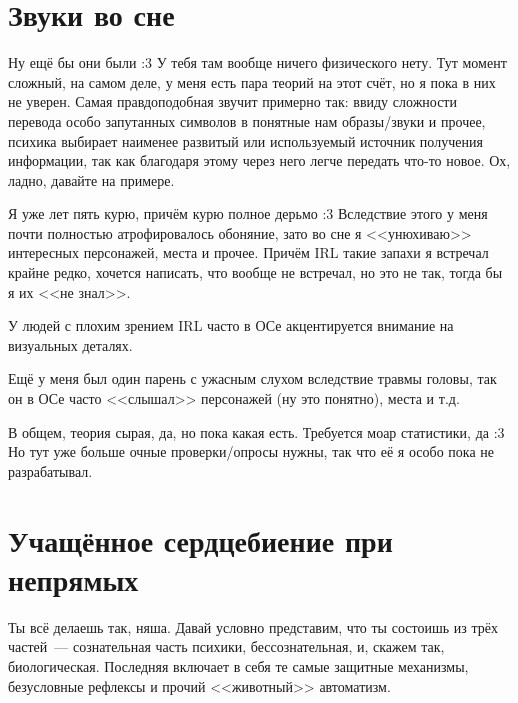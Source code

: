 \documentclass[a5paper,12pt,twoside]{memoir}
\begin{document}
\section{Звуки во сне}

Ну ещё бы они были :3 У тебя там вообще ничего физического нету. Тут момент сложный, на самом деле, у меня есть пара теорий на этот счёт, но я пока в них не уверен. 
Самая правдоподобная звучит примерно так: ввиду сложности перевода особо запутанных символов в понятные нам образы/звуки и прочее, психика выбирает наименее развитый или используемый источник получения информации, так как благодаря этому через него легче передать что-то новое. Ох, ладно, давайте на примере.

Я уже лет пять курю, причём курю полное дерьмо :3 Вследствие этого у меня почти полностью атрофировалось обоняние, зато во сне я <<унюхиваю>> интересных персонажей, места и прочее. Причём IRL такие запахи я встречал крайне редко, хочется написать, что вообще не встречал, но это не так, тогда бы я их <<не знал>>.

У людей с плохим зрением IRL часто в ОСе акцентируется внимание на визуальных деталях. 

Ещё у меня был один парень с ужасным слухом вследствие травмы головы, так он в ОСе часто <<слышал>> персонажей (ну это понятно), места и т.д. 

В общем, теория сырая, да, но пока какая есть. Требуется моар статистики, да :3 Но тут уже больше очные проверки/опросы нужны, так что её я особо пока не разрабатывал. 




\section{Учащённое сердцебиение при непрямых}

\medskip

Ты всё делаешь так, няша. Давай условно представим, что ты состоишь из трёх частей~--- сознательная часть психики, бессознательная, и, скажем так, биологическая. Последняя включает в себя те самые защитные механизмы, безусловные рефлексы и прочий <<животный>> автоматизм.
\end{document}
